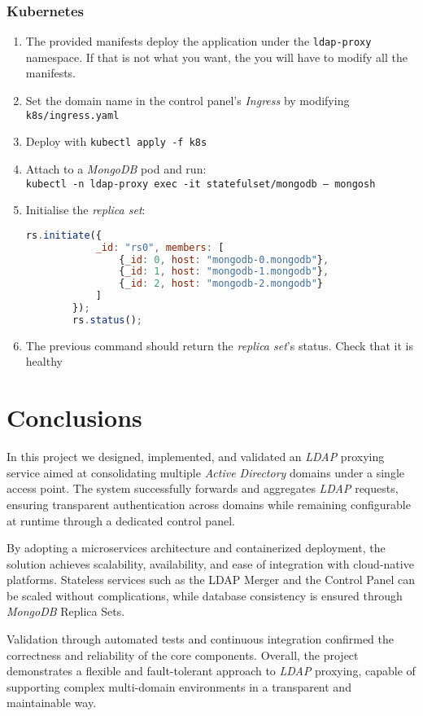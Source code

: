 \documentclass{scrartcl}
\begin{document}
\subsubsection{Kubernetes}
\begin{enumerate}
	\item The provided manifests deploy the application under the \texttt{ldap-proxy} namespace. If that is not what you want, the you will have to modify all the manifests.
	\item Set the domain name in the control panel's \textit{Ingress} by modifying \texttt{k8s/ingress.yaml} 
	\item Deploy with \texttt{kubectl apply -f k8s}
	\item Attach to a \textit{MongoDB} pod and run:\\
		\texttt{kubectl -n ldap-proxy exec -it statefulset/mongodb -- mongosh}
	\item Initialise the \textit{replica set}:
		\begin{lstlisting}[language=javascript]
		rs.initiate({
			_id: "rs0", members: [
				{_id: 0, host: "mongodb-0.mongodb"},
				{_id: 1, host: "mongodb-1.mongodb"},
				{_id: 2, host: "mongodb-2.mongodb"}
			]
		});
		rs.status();
		\end{lstlisting}
	\item The previous command should return the \textit{replica set}'s status. Check that it is healthy
\end{enumerate}

\section{Conclusions}

\par In this project we designed, implemented, and validated an \textit{LDAP} proxying service aimed at consolidating multiple \textit{Active Directory} domains under a single access point. The system successfully forwards and aggregates \textit{LDAP} requests, ensuring transparent authentication across domains while remaining configurable at runtime through a dedicated control panel.
\par By adopting a microservices architecture and containerized deployment, the solution achieves scalability, availability, and ease of integration with cloud-native platforms. Stateless services such as the LDAP Merger and the Control Panel can be scaled without complications, while database consistency is ensured through \textit{MongoDB} Replica Sets.
\par Validation through automated tests and continuous integration confirmed the correctness and reliability of the core components. Overall, the project demonstrates a flexible and fault-tolerant approach to \textit{LDAP} proxying, capable of supporting complex multi-domain environments in a transparent and maintainable way.
\end{document}
